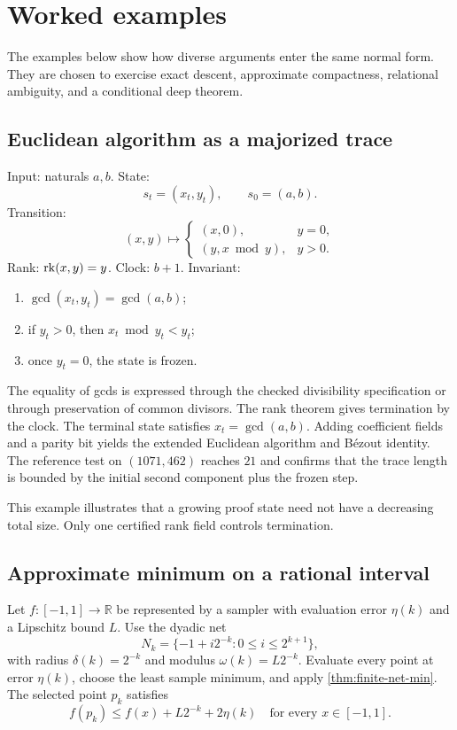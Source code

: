 \section{Worked examples}
\label{sec:examples}

The examples below show how diverse arguments enter the same normal form.  They are
chosen to exercise exact descent, approximate compactness, relational ambiguity, and a
conditional deep theorem.

\subsection{Euclidean algorithm as a majorized trace}

Input: naturals \(a,b\).  State:
\[
  s_t=(x_t,y_t),\qquad s_0=(a,b).
\]
Transition:
\[
  (x,y)\mapsto
  \begin{cases}
    (x,0),&y=0,\\
    (y,x\bmod y),&y>0.
  \end{cases}
\]
Rank: \(\operatorname{rk}(x,y)=y\).  Clock: \(b+1\).  Invariant:

\begin{enumerate}[label=(\roman*),leftmargin=2.4em]
\item \(\gcd(x_t,y_t)=\gcd(a,b)\);
\item if \(y_t>0\), then \(x_t\bmod y_t<y_t\);
\item once \(y_t=0\), the state is frozen.
\end{enumerate}

The equality of gcds is expressed through the checked divisibility specification or
through preservation of common divisors.  The rank theorem gives termination by the
clock.  The terminal state satisfies \(x_t=\gcd(a,b)\).  Adding coefficient fields and
a parity bit yields the extended Euclidean algorithm and B\'ezout identity.  The
reference test on \((1071,462)\) reaches \(21\) and confirms that the trace length is
bounded by the initial second component plus the frozen step.

This example illustrates that a growing proof state need not have a decreasing total
size.  Only one certified rank field controls termination.

\subsection{Approximate minimum on a rational interval}

Let \(f:[-1,1]\to\mathbb R\) be represented by a sampler with evaluation error
\(\eta(k)\) and a Lipschitz bound \(L\).  Use the dyadic net
\[
   N_k=\{-1+i2^{-k}:0\le i\le2^{k+1}\},
\]
with radius \(\delta(k)=2^{-k}\) and modulus
\(\omega(k)=L2^{-k}\).  Evaluate every point at error \(\eta(k)\), choose the least
sample minimum, and apply \cref{thm:finite-net-min}.  The selected point \(p_k\)
satisfies
\[
   f(p_k)\le f(x)+L2^{-k}+2\eta(k)
   \quad\text{for every }x\in[-1,1].
\]

